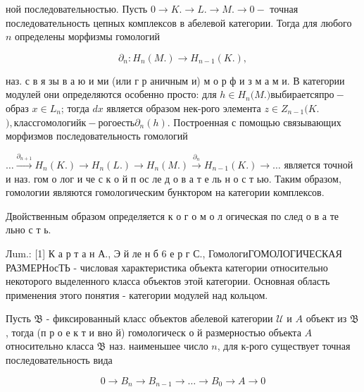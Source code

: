 \documentclass[10pt]{article}
\begin{document}
ной последовательностью. Пусть $0 \rightarrow K . \rightarrow L . \rightarrow M . \rightarrow 0-$ точная последовательность цепных комплексов в абелевой категории. Тогда для любого $n$ определены морфизмы гомологий



\[

\partial_{n}: H_{n}(M .) \longrightarrow H_{n-1}(K .),

\]



наз. с в я зы в а ю и ми (или г р аничным и) м о р ф и з м а м и. В категории модулей они определяются особенно просто: для $h \in H_{n}(M$.$) выбирается про-$ образ $x \in L_{n}$; тогда $d x$ является образом нек-рого элемента $z \in Z_{n-1}(K$.$) , класс гомологий к-рого есть \partial_{n}(h)$. Построенная с помощью связывающих морфизмов последовательность гомологий



$\ldots \stackrel{\partial_{n+1}}{\longrightarrow} H_{n}(K.) \longrightarrow H_{n}(L.) \longrightarrow H_{n}(M.) \stackrel{\partial_{n}}{\longrightarrow} H_{n-1}(K.) \longrightarrow \ldots$ является точной и наз. гом о лог и че с к о й п ос ле д о в а т е ль н о с т ью. Таким образом, гомологии являются гомологическим бунктором на категории комплексов.



Двойственным образом определяется к о г о м о л огическая по след о в а те льно с т ь.



Лum.: [1] К а р т а н А., Э й ле н б 6 е р г С., ГомологиГОМОЛОГИЧЕСКАЯ РАЗМЕРНосТЬ - числовая характеристика объекта категории относительно некоторого выделенного класса объектов этой категории. Основная область применения этого понятия - категории модулей над кольцом.



Пусть $\mathfrak{B}$ - фиксированный класс объектов абелевой категории $\mathfrak{\mathcal { U }}$ и $A$ объект из $\mathfrak{B}$, тогда (п р о е к т и вно й) гомологическ о й размерностью объекта $A$ относительно класса $\mathfrak{B}$ наз. наименьшее число $n$, для к-рого существует точная последовательность вида



\[

0 \longrightarrow B_{n} \longrightarrow B_{n-1} \longrightarrow \ldots \longrightarrow B_{0} \longrightarrow A \longrightarrow 0

\]
\end{document}
